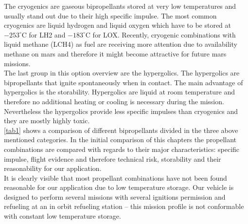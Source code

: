 The cryogenics are gaseous bipropellants stored at very low temperatures and usually stand out due to their high specific impulse. The most common cryogenics are liquid hydrogen and liquid oxygen which have to be stored at $-253^\circ$C for LH2 and $-183^\circ$C for LOX. Recently, cryogenic combinations with liquid methane (LCH4) as fuel are receiving more attention due to availability methane on mars and therefore it might become attractive for future mars missions.\\

The last group in this option overview are the hypergolics. The hypergolics are bipropellants that ignite spontaneously when in contact. The main advantage of hypergolics is the storability. Hypergolics are liquid at room temperature and therefore no additional heating or cooling is necessary during the mission. Nevertheless the hypergolics provide less specific impulses than cryogenics and they are mostly highly toxic.\\

\autoref{tab1} shows a comparison of different bipropellants divided in the three above mentioned categories. In the initial comparison of this chapters the propellant combinations are compared with regards to their major characteristics: specific impulse, flight evidence and therefore technical risk, storability and their reasonability for our application. \\

It is clearly visible that most propellant combinations have not been found reasonable for our application due to low temperature storage. Our vehicle is designed to perform several missions with several ignitions permission and refueling at an in orbit refueling station – this mission profile is not conformable with constant low temperature storage. \\

